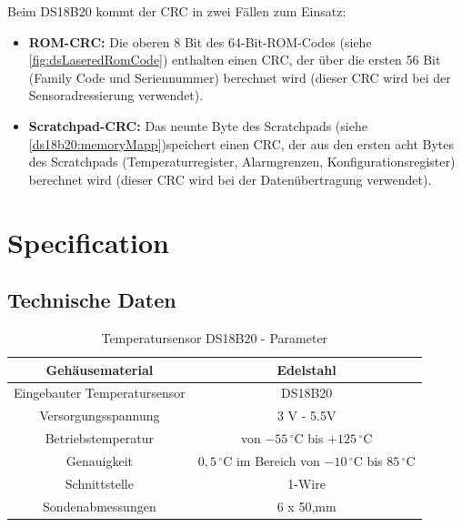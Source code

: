 	Beim DS18B20 kommt der CRC in zwei Fällen zum Einsatz:  
	\begin{itemize}
		\item \textbf{ROM-CRC:} Die oberen 8 Bit des 64-Bit-ROM-Codes (siehe \autoref{fig:dsLaseredRomCode}) enthalten einen CRC, der über die ersten 56 Bit (Family Code und Seriennummer) berechnet wird (dieser CRC wird bei der Sensoradressierung verwendet).
		\item \textbf{Scratchpad-CRC:} Das neunte Byte des Scratchpads (siehe \autoref{ds18b20:memoryMapp})speichert einen CRC, der aus den ersten acht Bytes des Scratchpads (Temperaturregister, Alarmgrenzen, Konfigurationsregister) berechnet wird (dieser CRC wird bei der Datenübertragung verwendet).
	\end{itemize}



\section{Specification}
\subsection{Technische Daten}
\begin{table}[H]
	\centering
	\begin{tabular}{|c|c|}
		\hline
		Gehäusematerial & Edelstahl \\
		\hline
		Eingebauter Temperatursensor & DS18B20 \\
		\hline
		Versorgungsspannung & 3 V - 5.5V \\
		\hline
		Betriebstemperatur & von $-55\,^\circ\mathrm{C}$ bis $+125\,^\circ\mathrm{C}$ \\
		\hline
		Genauigkeit & \pm $0,5\,^\circ\mathrm{C}$ im Bereich von $-10\,^\circ\mathrm{C}$ bis $85\,^\circ\mathrm{C}$ \\
		\hline
		Schnittstelle & 1-Wire\\
		\hline
		Sondenabmessungen & 6 x 50{,}mm\\
		\hline
	\end{tabular}
	\caption{Temperatursensor DS18B20 - Parameter}	%
\end{table}		


